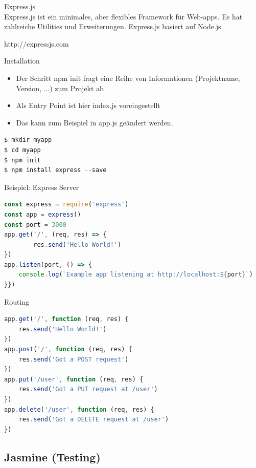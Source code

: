 \begin{concept}{Express.js}\\
    Express.js ist ein minimales, aber flexibles Framework für Web-apps. Es hat zahlreiche Utilities und Erweiterungen. Express.js basiert auf Node.js.

    http://expressjs.com
\end{concept}


\begin{KR}{Installation}
\begin{itemize}
  \item Der Schritt npm init fragt eine Reihe von Informationen (Projektname, Version, ...) zum Projekt ab
  \item Als Entry Point ist hier index.js voreingestellt
  \item Das kann zum Beispiel in app.js geändert werden.
\end{itemize}
\begin{lstlisting}[language=JavaScript, style=base]
$ mkdir myapp
$ cd myapp
$ npm init
$ npm install express --save
\end{lstlisting}
\end{KR}

\begin{code}{Beispiel: Express Server}
\begin{lstlisting}[language=JavaScript, style=base]
const express = require('express')
const app = express()
const port = 3000
app.get('/', (req, res) => {
        res.send('Hello World!')
})
app.listen(port, () => {
    console.log(`Example app listening at http://localhost:${port}`)
}})
\end{lstlisting}
\end{code}

\begin{KR}{Routing}
\begin{lstlisting}[language=JavaScript, style=base]
app.get('/', function (req, res) {
    res.send('Hello World!')
})
app.post('/', function (req, res) {
    res.send('Got a POST request')
})
app.put('/user', function (req, res) {
    res.send('Got a PUT request at /user')
})
app.delete('/user', function (req, res) {
    res.send('Got a DELETE request at /user')
})
\end{lstlisting}
\end{KR}






\subsection{Jasmine (Testing)}

